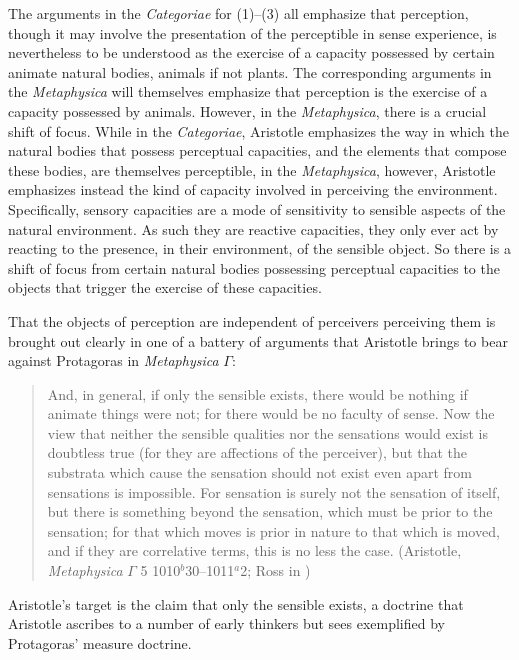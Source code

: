 The arguments in the \emph{Categoriae} for (1)--(3) all emphasize that perception, though it may involve the presentation of the perceptible in sense experience, is nevertheless to be understood as the exercise of a capacity possessed by certain animate natural bodies, animals if not plants. The corresponding arguments in the \emph{Metaphysica} will themselves emphasize that perception is the exercise of a capacity possessed by animals. However, in the \emph{Metaphysica}, there is a crucial shift of focus. While in the \emph{Categoriae}, Aristotle emphasizes the way in which the natural bodies that possess perceptual capacities, and the elements that compose these bodies, are themselves perceptible, in the \emph{Metaphysica}, however, Aristotle emphasizes instead the kind of capacity involved in perceiving the environment. 
Specifically, sensory capacities are a mode of sensitivity to sensible aspects of the natural environment. As such they are reactive capacities, they only ever act by reacting to the presence, in their environment, of the sensible object. So there is a shift of focus from certain natural bodies possessing perceptual capacities to the objects that trigger the exercise of these capacities.


That the objects of perception are independent of perceivers perceiving them is brought out clearly in one of a battery of arguments that Aristotle brings to bear against Protagoras in \emph{Metaphysica} \( \Gamma \):
\begin{quote}
	And, in general, if only the sensible exists, there would be nothing if animate things were not; for there would be no faculty of sense. Now the view that neither the sensible qualities nor the sensations would exist is doubtless true (for they are affections of the perceiver), but that the substrata which cause the sensation should not exist even apart from sensations is impossible. For sensation is surely not the sensation of itself, but there is something beyond the sensation, which must be prior to the sensation; for that which moves is prior in nature to that which is moved, and if they are correlative terms, this is no less the case. (Aristotle, \emph{Metaphysica} \( \Gamma \) 5 1010\( ^{b} \)30--1011\( ^{a} \)2; Ross in \citealt[55--56]{Barnes:1984kx})
\end{quote}
Aristotle's target is the claim that only the sensible exists, a doctrine that Aristotle ascribes to a number of early thinkers but sees exemplified by Protagoras' measure doctrine. 

